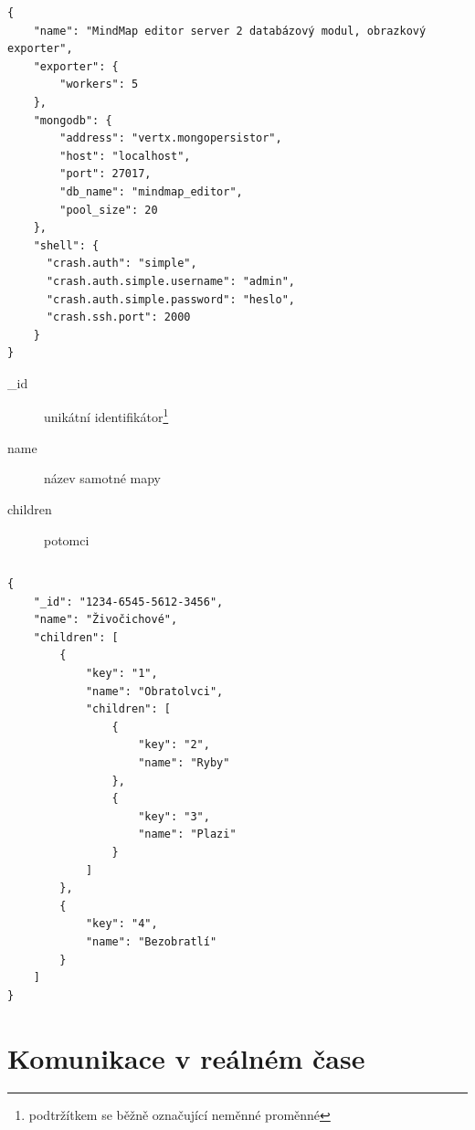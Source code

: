 \begin{lstlisting}[caption={Konfigurace serveru 2},label=confServ2]
{
    "name": "MindMap editor server 2 databázový modul, obrazkový exporter",
    "exporter": {
        "workers": 5
    },
    "mongodb": {
        "address": "vertx.mongopersistor",
        "host": "localhost",
        "port": 27017,
        "db_name": "mindmap_editor",
        "pool_size": 20
    },
    "shell": {
      "crash.auth": "simple",
      "crash.auth.simple.username": "admin",
      "crash.auth.simple.password": "heslo",
      "crash.ssh.port": 2000
    }
}
\end{lstlisting}

\begin{description}
\item[\_id] unikátní identifikátor\footnote{podtržítkem se běžně označující neměnné proměnné}
\item[name] název samotné mapy
\item[children] potomci
\end{description}

\begin{lstlisting}
\end{lstlisting}

\begin{lstlisting}
{
	"_id": "1234-6545-5612-3456",
	"name": "Živočichové",
	"children": [
		{
			"key": "1",
			"name": "Obratolvci",
			"children": [
				{
					"key": "2",
					"name": "Ryby"
				},
				{
					"key": "3",
					"name": "Plazi"
				}
			]
		},
		{
			"key": "4",
			"name": "Bezobratlí"
		}
	]
}
\end{lstlisting}

\section{Komunikace v reálném čase}\label{sec:realTimeCommunication}

